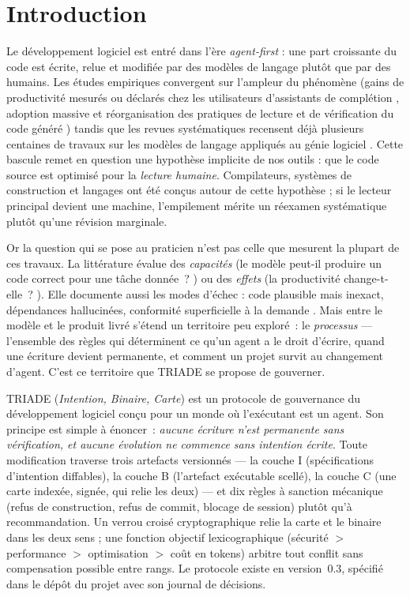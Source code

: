 \section{Introduction}\label{sec:intro}

Le développement logiciel est entré dans l’ère \emph{agent-first} : une part
croissante du code est écrite, relue et modifiée par des modèles de langage
plutôt que par des humains. Les études empiriques convergent sur l’ampleur du
phénomène (gains de productivité mesurés ou déclarés chez les utilisateurs
d’assistants de complétion \cite{ziegler2022,peng2023}, adoption massive et
réorganisation des pratiques de lecture et de vérification du code généré
\cite{vaithilingam2022,barke2023}) tandis que les revues systématiques
recensent déjà plusieurs centaines de travaux sur les modèles de langage
appliqués au génie logiciel \cite{hou2024,fan2023}. Cette bascule remet en
question une hypothèse implicite de nos outils : que le code source est optimisé
pour la \emph{lecture humaine}. Compilateurs, systèmes de construction et
langages ont été conçus autour de cette hypothèse ; si le lecteur principal
devient une machine, l’empilement mérite un réexamen systématique plutôt qu’une
révision marginale.

Or la question qui se pose au praticien n’est pas celle que mesurent la
plupart de ces travaux. La littérature évalue des \emph{capacités} (le modèle
peut-il produire un code correct pour une tâche donnée~?
\cite{chen2021,austin2021}) ou des \emph{effets} (la productivité change-t-elle~?
\cite{peng2023}). Elle documente aussi les modes d’échec : code plausible mais
inexact, dépendances hallucinées, conformité superficielle à la demande
\cite{hou2024}. Mais entre le modèle et le produit livré s’étend un territoire
peu exploré~: le \emph{processus} — l’ensemble des règles qui déterminent ce
qu’un agent a le droit d’écrire, quand une écriture devient permanente, et
comment un projet survit au changement d’agent. C’est ce territoire que
TRIADE se propose de gouverner.

TRIADE (\emph{Intention, Binaire, Carte}) est un protocole de gouvernance du
développement logiciel conçu pour un monde où l’exécutant est un agent. Son
principe est simple à énoncer~: \emph{aucune écriture n’est permanente sans
vérification, et aucune évolution ne commence sans intention écrite}. Toute
modification traverse trois artefacts versionnés — la couche I
(spécifications d’intention diffables), la couche B (l’artefact exécutable
scellé), la couche C (une carte indexée, signée, qui relie les deux) — et dix
règles à sanction mécanique (refus de construction, refus de commit, blocage
de session) plutôt qu’à recommandation. Un verrou croisé cryptographique relie
la carte et le binaire dans les deux sens ; une fonction objectif
lexicographique (sécurité $>$ performance $>$ optimisation $>$ coût en tokens)
arbitre tout conflit sans compensation possible entre rangs. Le protocole
existe en version~0.3, spécifié dans le dépôt du projet avec son journal de
décisions.

